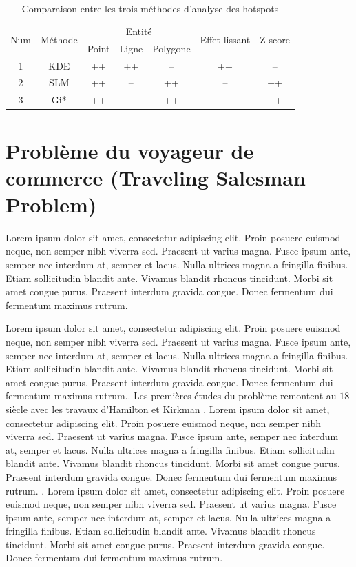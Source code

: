\medskip

\begin{table}[h!]
    \centering
    \begin{tabular}{|c|c|c|c|c|c|c|}
        \hline
        \multirow{2}{*}{Num} & \multirow{2}{*}{Méthode} & \multicolumn{3}{c|}{Entité} &\multirow{2}{*}{Effet lissant} & \multirow{2}{*}{Z-score} \\
        \cline{3-5}
           & & Point & Ligne & Polygone & &  \\
        \hline
         1 & KDE & ++ & ++ & -- & ++ & --  \\
        \hline
         2 & SLM & ++ & -- & ++ & -- & ++  \\
        \hline
        3 & Gi* & ++ & --  & ++ & -- & ++ \\
        \hline
    \end{tabular}
    \caption{Comparaison entre les trois méthodes d'analyse des hotspots}
    \label{tab:hotspot-analysis-comparison-2}
\end{table}
\FloatBarrier




\section{Problème du voyageur de commerce (Traveling Salesman Problem)}
Lorem ipsum dolor sit amet, consectetur adipiscing elit. Proin posuere euismod neque, non semper nibh viverra sed. Praesent ut varius magna. Fusce ipsum ante, semper nec interdum at, semper et lacus. Nulla ultrices magna a fringilla finibus. Etiam sollicitudin blandit ante. Vivamus blandit rhoncus tincidunt. Morbi sit amet congue purus. Praesent interdum gravida congue. Donec fermentum dui fermentum maximus rutrum.


Lorem ipsum dolor sit amet, consectetur adipiscing elit. Proin posuere euismod neque, non semper nibh viverra sed. Praesent ut varius magna. Fusce ipsum ante, semper nec interdum at, semper et lacus. Nulla ultrices magna a fringilla finibus. Etiam sollicitudin blandit ante. Vivamus blandit rhoncus tincidunt. Morbi sit amet congue purus. Praesent interdum gravida congue. Donec fermentum dui fermentum maximus rutrum.. Les premières études du problème remontent au $18$ siècle  avec les travaux d'Hamilton et Kirkman \parencite{davendra_traveling_2010}. Lorem ipsum dolor sit amet, consectetur adipiscing elit. Proin posuere euismod neque, non semper nibh viverra sed. Praesent ut varius magna. Fusce ipsum ante, semper nec interdum at, semper et lacus. Nulla ultrices magna a fringilla finibus. Etiam sollicitudin blandit ante. Vivamus blandit rhoncus tincidunt. Morbi sit amet congue purus. Praesent interdum gravida congue. Donec fermentum dui fermentum maximus rutrum. \parencite{gutin_traveling_2006}. Lorem ipsum dolor sit amet, consectetur adipiscing elit. Proin posuere euismod neque, non semper nibh viverra sed. Praesent ut varius magna. Fusce ipsum ante, semper nec interdum at, semper et lacus. Nulla ultrices magna a fringilla finibus. Etiam sollicitudin blandit ante. Vivamus blandit rhoncus tincidunt. Morbi sit amet congue purus. Praesent interdum gravida congue. Donec fermentum dui fermentum maximus rutrum.

